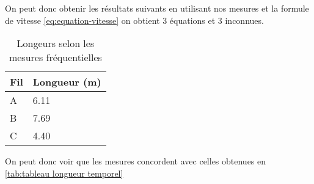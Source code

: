 On peut donc obtenir les résultats suivants en utilisant nos mesures et la formule de vitesse \ref{eq:equation-vitesse} on obtient 3 équations
et 3 inconnues.

\begin{center}
\begin{table}[H]
\caption{Longeurs selon les mesures fréquentielles} \label{tab:tableau longueur frequentiel}
\begin{tabularx}{\textwidth}{ X X }
    Fil & Longueur (m) \\
    \hline
    \hline
    A & 6.11 \\
    B & 7.69 \\
    C & 4.40 \\
    \hline
\end{tabularx}
\end{table}
\end{center}

On peut donc voir que les mesures concordent avec celles obtenues en \ref{tab:tableau longueur temporel}